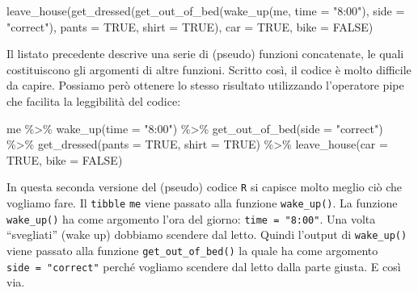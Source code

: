 \documentclass[
  10pt,
  italian,
  a4paper,
  extrafontsizes,onecolumn,openright
  ]{memoir}
\newenvironment{Shaded}{\begin{snugshade}}{\end{snugshade}}
\newcommand{\AttributeTok}[1]{\textcolor[rgb]{0.77,0.63,0.00}{#1}}
\newcommand{\ConstantTok}[1]{\textcolor[rgb]{0.00,0.00,0.00}{#1}}
\newcommand{\FunctionTok}[1]{\textcolor[rgb]{0.00,0.00,0.00}{#1}}
\newcommand{\NormalTok}[1]{#1}
\newcommand{\SpecialCharTok}[1]{\textcolor[rgb]{0.00,0.00,0.00}{#1}}
\newcommand{\StringTok}[1]{\textcolor[rgb]{0.31,0.60,0.02}{#1}}
\begin{document}
\begin{Shaded}
\begin{Highlighting}[]
\FunctionTok{leave\_house}\NormalTok{(}\FunctionTok{get\_dressed}\NormalTok{(}\FunctionTok{get\_out\_of\_bed}\NormalTok{(}\FunctionTok{wake\_up}\NormalTok{(me, }\AttributeTok{time =} \StringTok{"8:00"}\NormalTok{), }\AttributeTok{side =} \StringTok{"correct"}\NormalTok{), }
\AttributeTok{pants =} \ConstantTok{TRUE}\NormalTok{, }\AttributeTok{shirt =} \ConstantTok{TRUE}\NormalTok{), }\AttributeTok{car =} \ConstantTok{TRUE}\NormalTok{, }\AttributeTok{bike =} \ConstantTok{FALSE}\NormalTok{)}
\end{Highlighting}
\end{Shaded}

Il listato precedente descrive una serie di (pseudo) funzioni concatenate, le quali costituiscono gli argomenti di altre funzioni. Scritto così, il codice è molto difficile da capire. Possiamo però ottenere lo stesso risultato utilizzando l'operatore pipe che facilita la leggibilità del codice:

\begin{Shaded}
\begin{Highlighting}[]
\NormalTok{me }\SpecialCharTok{\%\textgreater{}\%} 
  \FunctionTok{wake\_up}\NormalTok{(}\AttributeTok{time =} \StringTok{"8:00"}\NormalTok{) }\SpecialCharTok{\%\textgreater{}\%} 
  \FunctionTok{get\_out\_of\_bed}\NormalTok{(}\AttributeTok{side =} \StringTok{"correct"}\NormalTok{) }\SpecialCharTok{\%\textgreater{}\%} 
  \FunctionTok{get\_dressed}\NormalTok{(}\AttributeTok{pants =} \ConstantTok{TRUE}\NormalTok{, }\AttributeTok{shirt =} \ConstantTok{TRUE}\NormalTok{) }\SpecialCharTok{\%\textgreater{}\%} 
  \FunctionTok{leave\_house}\NormalTok{(}\AttributeTok{car =} \ConstantTok{TRUE}\NormalTok{, }\AttributeTok{bike =} \ConstantTok{FALSE}\NormalTok{)}
\end{Highlighting}
\end{Shaded}

In questa seconda versione del (pseudo) codice \texttt{R} si capisce molto meglio ciò che vogliamo fare. Il \texttt{tibble} \texttt{me} viene passato alla funzione \texttt{wake\_up()}. La funzione \texttt{wake\_up()} ha come argomento l'ora del giorno: \texttt{time\ =\ "8:00"}. Una volta ``svegliati'' (wake up) dobbiamo scendere dal letto. Quindi l'output di \texttt{wake\_up()} viene passato alla funzione \texttt{get\_out\_of\_bed()} la quale ha come argomento \texttt{side\ =\ "correct"} perché vogliamo scendere dal letto dalla parte giusta. E così via.
\end{document}
